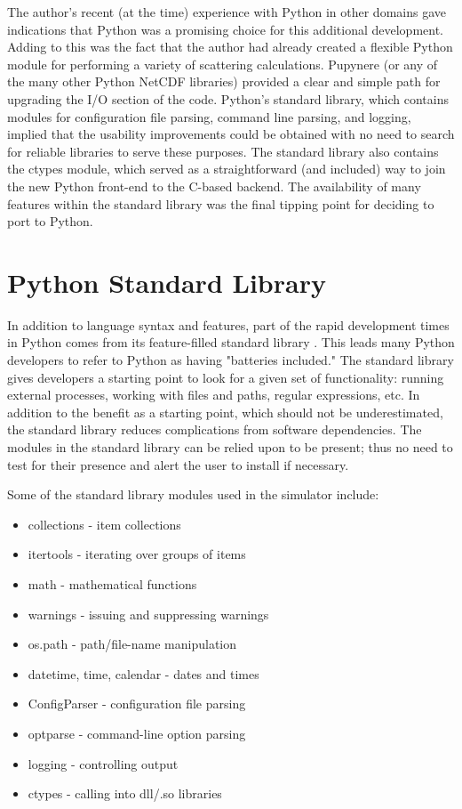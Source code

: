 \documentclass[twocolumn]{article}
\begin{document}
The author's recent (at the time) experience with Python in other domains gave
indications that Python was a promising choice for this additional development.
Adding to this was the fact that the author had already created a flexible
Python module for performing a variety of scattering calculations. Pupynere (or
any of the many other Python NetCDF libraries) provided a clear and simple path
for upgrading the I/O section of the code. Python's standard library, which
contains modules for configuration file parsing, command line parsing, and
logging, implied that the usability improvements could be obtained with no need
to search for reliable libraries to serve these purposes. The standard library
also contains the ctypes module, which served as a straightforward (and
included) way to join the new Python front-end to the C-based backend. The
availability of many features within the standard library was the final tipping
point for deciding to port to Python.

\section{Python Standard Library}
In addition to language syntax and features, part of the rapid development times
in Python comes from its feature-filled standard library \cite{pythonlib}. This
leads many Python developers to refer to Python as having "batteries included."
The standard library gives developers a starting point to look for a given set
of functionality: running external processes, working with files and paths,
regular expressions, etc. In addition to the benefit as a starting point, which
should not be underestimated, the standard library reduces complications from
software dependencies. The modules in the standard library can be relied upon to
be present; thus no need to test for their presence and alert the user to
install if necessary.

Some of the standard library modules used in the simulator include:
\begin{itemize}
    \item collections - item collections
    \item itertools - iterating over groups of items
    \item math - mathematical functions
    \item warnings - issuing and suppressing warnings
    \item os.path - path/file-name manipulation
    \item datetime, time, calendar - dates and times
    \item ConfigParser - configuration file parsing
    \item optparse - command-line option parsing
    \item logging - controlling output
    \item ctypes - calling into dll/.so libraries
\end{itemize}
\end{document}
